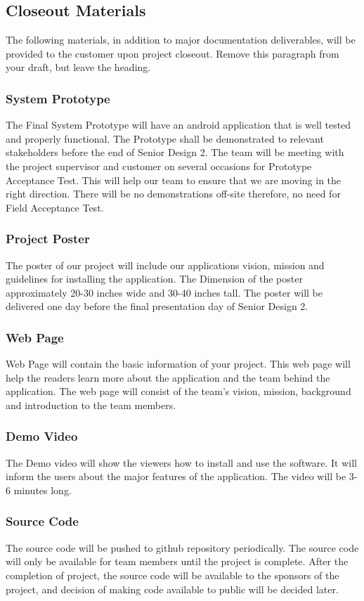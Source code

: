 \subsection{Closeout Materials}
The following materials, in addition to major documentation deliverables, will be provided to the customer upon project closeout. Remove this paragraph from your draft, but leave the heading.

\subsubsection{System Prototype}
The Final System Prototype will have an android application that is well tested and properly functional. 
The Prototype shall be demonstrated to relevant stakeholders before the end of Senior Design 2. The team will 
be meeting with the project supervisor and customer on several occasions for Prototype Acceptance Test. This 
will help our team to ensure that we are moving in the right direction. There will be no demonstrations off-site 
therefore, no need for Field Acceptance Test.
\subsubsection{Project Poster}
The poster of our project will include our applications vision, mission and guidelines for installing 
the application. The Dimension of the poster approximately 20-30 inches wide and 30-40 inches tall. The poster 
will be delivered one day before the final presentation day of Senior Design 2.
\subsubsection{Web Page}
Web Page will contain the basic information of your project. This web page will help the readers learn more about 
the application and the team behind the application. The web page will consist of the team's vision, mission, 
background and introduction to the team members.
\subsubsection{Demo Video}
The Demo video will show the viewers how to install and use the software. 
It will inform the users about the major features of the application. The video will be 3-6 minutes long.
\subsubsection{Source Code}
The source code will be pushed to github repository periodically. The source code will only be available 
for team members until the project is complete. After the completion of project, the source code will be 
available to the sponsors of the project, and decision of making code available to public will be decided later.
